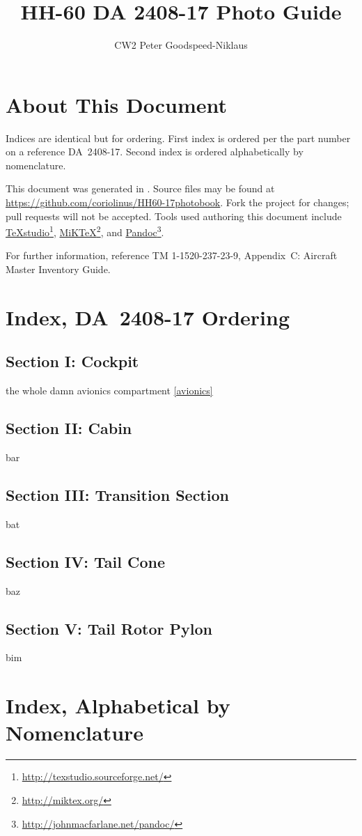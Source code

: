 \documentclass[letterpaper,11pt,openany,oneside]{book}
\author{CW2 Peter Goodspeed-Niklaus}
\title{HH-60 DA 2408-17 Photo Guide}
\begin{document}
\frontmatter
\maketitle
\clearpage
\setcounter{page}{1}
\chapter*{About This Document}
Indices are identical but for ordering. First index is ordered per the part number on a reference DA~2408-17. Second index is ordered alphabetically by nomenclature.

This document was generated in \LaTeXe. Source files may be found at \url{https://github.com/coriolinus/HH60-17photobook}. Fork the project for changes; pull requests will not be accepted. Tools used authoring this document include \href{http://texstudio.sourceforge.net/}{TeXstudio}\footnote{\url{http://texstudio.sourceforge.net/}}, \href{http://miktex.org/}{MiKTeX}\footnote{\url{http://miktex.org/}}, and \href{http://johnmacfarlane.net/pandoc/}{Pandoc}\footnote{\url{http://johnmacfarlane.net/pandoc/}}.

For further information, reference TM 1-1520-237-23-9, Appendix~C: Aircraft Master Inventory Guide.
\mainmatter
\chapter*{Index, DA~2408-17 Ordering}
\section*{Section I: Cockpit}
the whole damn avionics compartment \ref{avionics}
\section*{Section II: Cabin}
bar
\section*{Section III: Transition Section}
bat
\section*{Section IV: Tail Cone}
baz
\section*{Section V: Tail Rotor Pylon}
bim
\chapter*{Index, Alphabetical by Nomenclature}
\end{document}

